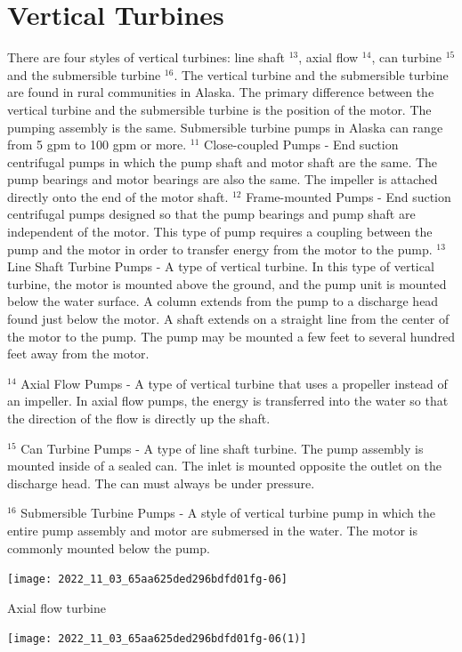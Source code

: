 \documentclass[10pt]{article}
\begin{document}
\section{Vertical Turbines}
There are four styles of vertical turbines: line shaft ${ }^{13}$, axial flow $^{14}$, can turbine ${ }^{15}$ and the submersible turbine ${ }^{16}$. The vertical turbine and the submersible turbine are found in rural communities in Alaska. The primary difference between the vertical turbine and the submersible turbine is the position of the motor. The pumping assembly is the same. Submersible turbine pumps in Alaska can range from 5 gpm to 100 gpm or more. ${ }^{11}$ Close-coupled Pumps - End suction centrifugal pumps in which the pump shaft and motor shaft are the same. The pump bearings and motor bearings are also the same. The impeller is attached directly onto the end of the motor shaft. ${ }^{12}$ Frame-mounted Pumps - End suction centrifugal pumps designed so that the pump bearings and pump shaft are independent of the motor. This type of pump requires a coupling between the pump and the motor in order to transfer energy from the motor to the pump. ${ }^{13}$ Line Shaft Turbine Pumps - A type of vertical turbine. In this type of vertical turbine, the motor is mounted above the ground, and the pump unit is mounted below the water surface. A column extends from the pump to a discharge head found just below the motor. A shaft extends on a straight line from the center of the motor to the pump. The pump may be mounted a few feet to several hundred feet away from the motor.

${ }^{14}$ Axial Flow Pumps - A type of vertical turbine that uses a propeller instead of an impeller. In axial flow pumps, the energy is transferred into the water so that the direction of the flow is directly up the shaft.

${ }^{15}$ Can Turbine Pumps - A type of line shaft turbine. The pump assembly is mounted inside of a sealed can. The inlet is mounted opposite the outlet on the discharge head. The can must always be under pressure.

${ }^{16}$ Submersible Turbine Pumps - A style of vertical turbine pump in which the entire pump assembly and motor are submersed in the water. The motor is commonly mounted below the pump.

\texttt{[image: 2022\_11\_03\_65aa625ded296bdfd01fg-06]}

Axial flow turbine

\texttt{[image: 2022\_11\_03\_65aa625ded296bdfd01fg-06(1)]}
\end{document}
